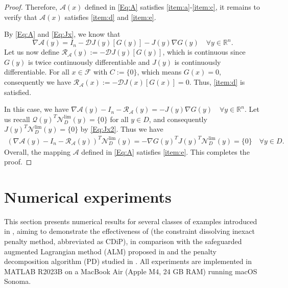 \documentclass[11pt,a4paper,reqno]{amsart}
\begin{document}
{\begin{proof}
Therefore, $\mathcal A(x)$ defined in \eqref{Eq:A} satisfies  \ref{item:a}-\ref{item:c}, it remains to verify that $\mathcal A(x)$ satisfies  \ref{item:d} and \ref{item:e}.

By \eqref{Eq:A} and \eqref{Eq:Jx}, we know that
\begin{equation*}
    \nabla \mathcal A(y)=I_n-\mathcal D J(y)[G(y)]-J(y)\nabla G(y) \quad \forall y\in \mathbb R^n.
\end{equation*}
Let us now define $\mathcal R_{\mathcal A}(y):=-\mathcal D J(y)[G(y)]$, which is continuous since $G(y)$ is twice continuously differentiable and $J(y)$ is continuously differentiable. For all $x \in \mathcal F$ with $C:=\{0\}$, which means $G(x)=0$, consequently we have $\mathcal R_{\mathcal A}(x):=-\mathcal D J(x)[G(x)]=0$. Thus,  \ref{item:d} is satisfied.

In this case, we have $ \nabla \mathcal A(y)-I_n-\mathcal R_{\mathcal A}(y)=-J(y)\nabla G(y) \quad \forall y\in \mathbb R^n$.
Let us recall $\mathcal Q(y)^T \mathcal N_D^{\text{lim}}(y)=\{0\}$ for all $y\in D$, and consequently $J(y)^T\mathcal N_D^{\text{lim}}(y)=\{0\}$ by \eqref{Eq:Jx2}. Thus 
we have
\begin{equation}\label{Eq:7}
    \begin{aligned}
        \left( \nabla \mathcal A(y)-I_n-\mathcal R_{\mathcal A}(y)\right)^T\mathcal N_D^{\text{lim}} (y)=-\nabla G(y)^T J(y)^T\mathcal N_D^{\text{lim}} (y)=\{0\} \quad \forall y\in D.
    \end{aligned}
\end{equation}
Overall, the mapping $\mathcal A$ defined in \eqref{Eq:A} satisfies \ref{item:e}. This completes the proof.
\end{proof}

\section{Numerical experiments}\label{Sec:num}
This section presents numerical results for several classes of examples introduced in , aiming to demonstrate the effectiveness of  (the constraint dissolving inexact penalty method, abbreviated as CDiP), in comparison with the safeguarded augmented Lagrangian method (ALM) proposed in \cite{jia2023augmented} and the penalty decomposition algorithm (PD) studied in \cite{kanzow2023inexact}. All experiments are implemented in \textsc{MATLAB R2023B} on a MacBook Air (Apple M4, 24 GB RAM) running macOS Sonoma. 

}
\end{document}
